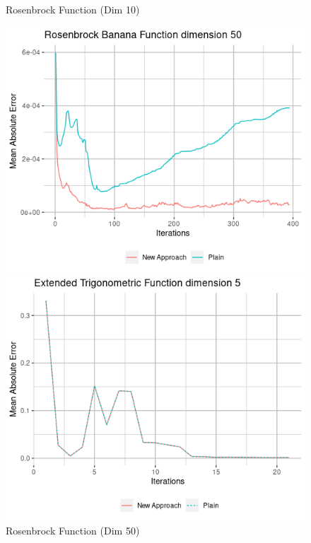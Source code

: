 \documentclass{article}
\begin{document}
\begin{figure}[H]
\begin{minipage}[b]{0.5\linewidth}
		\caption{Rosenbrock Function (Dim 10)} 
		\vspace{4ex}
	\end{minipage} 
	\begin{minipage}[b]{0.5\linewidth}
		\centering
		\includegraphics[scale=0.5]{plots/Rosenbrock_Banana_dim50.png} 
		\caption{Rosenbrock Function (Dim 50)} 
		\vspace{4ex}
	\end{minipage}%
	\begin{minipage}[b]{0.5\linewidth}
		\centering
		\includegraphics[scale=0.5]{plots/Extended_Trigonometric_dim5.png} 

\end{minipage}
\end{figure}
\end{document}

